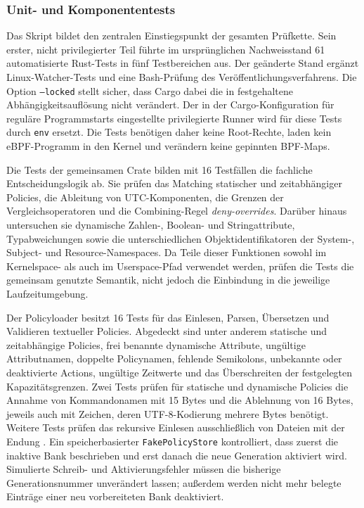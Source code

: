 \subsubsection{Unit- und Komponententests}

Das Skript  bildet den zentralen Einstiegspunkt der gesamten Prüfkette. Sein erster,
nicht privilegierter Teil führte im ursprünglichen Nachweisstand 61 automatisierte Rust-Tests in fünf Testbereichen aus. Der geänderte Stand ergänzt Linux-Watcher-Tests und eine Bash-Prüfung des Veröffentlichungsverfahrens. Die Option
\texttt{--locked} stellt sicher, dass Cargo dabei die
in  festgehaltene Abhängigkeitsauflösung nicht verändert. Der in der
Cargo-Konfiguration für reguläre Programmstarts eingestellte privilegierte Runner wird für diese
Tests durch \texttt{env} ersetzt. Die Tests benötigen daher keine Root-Rechte, laden kein
eBPF-Programm in den Kernel und verändern keine gepinnten BPF-Maps.

Die Tests der gemeinsamen Crate  bilden mit 16 Testfällen die fachliche
Entscheidungslogik ab. Sie prüfen das Matching statischer und zeitabhängiger Policies, die
Ableitung von UTC-Komponenten, die Grenzen der Vergleichsoperatoren und die Combining-Regel
\emph{deny-overrides}. Darüber hinaus untersuchen sie dynamische Zahlen-, Boolean- und
Stringattribute, Typabweichungen sowie die unterschiedlichen Objektidentifikatoren der System-,
Subject- und Resource-Namespaces. Da Teile dieser Funktionen sowohl im Kernelspace- als auch im
Userspace-Pfad verwendet werden, prüfen die Tests die gemeinsam genutzte Semantik, nicht jedoch
die Einbindung in die jeweilige Laufzeitumgebung.

Der Policyloader besitzt 16 Tests für das Einlesen, Parsen, Übersetzen und Validieren textueller
Policies. Abgedeckt sind unter anderem statische und zeitabhängige Policies, frei benannte
dynamische Attribute, ungültige Attributnamen, doppelte Policynamen, fehlende Semikolons,
unbekannte oder deaktivierte Actions, ungültige Zeitwerte und das Überschreiten der festgelegten
Kapazitätsgrenzen. Zwei Tests prüfen für statische und dynamische Policies die Annahme von
Kommandonamen mit 15 Bytes und die Ablehnung von 16 Bytes, jeweils auch mit Zeichen, deren
UTF-8-Kodierung mehrere Bytes benötigt. Weitere Tests prüfen das rekursive Einlesen ausschließlich von Dateien mit der
Endung . Ein speicherbasierter \texttt{FakePolicyStore} kontrolliert, dass zuerst
die inaktive Bank beschrieben und erst danach die neue Generation aktiviert wird. Simulierte
Schreib- und Aktivierungsfehler müssen die bisherige Generationsnummer unverändert lassen; außerdem
werden nicht mehr belegte Einträge einer neu vorbereiteten Bank deaktiviert.

